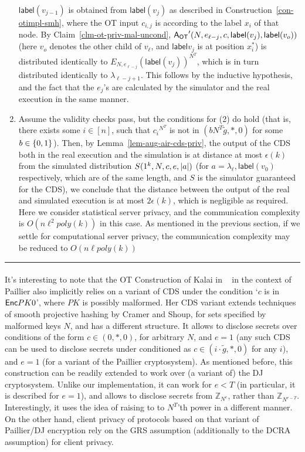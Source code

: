 \documentclass[11pt]{article}
\newenvironment{proof}{\noindent {\bf Proof:} \hspace{.677em}}%
                     {\qed}
\newcommand{\qed}{\hspace*{\fill}\rule{0.6em}{0.6em}}
\newcommand{\eps}{{\epsilon}}
\newcommand{\lab}{{\mathsf{label}}}
\newcommand{\enc}{{\sf Enc}}
\newcommand{\ansot}{{\sf A_{OT}}}
\newcommand{\Z}{\mathbb{Z}}
\newcommand\ot{\mbox{OT}\xspace}
\newcommand{\encr}[2]{E_{#1}(#2)}
\newcommand{\mathify}[1]{\ifmmode{#1}\else\mbox{$#1$}\fi}
\newcommand{\set}[2][]{\mathify{{\left\{#2\right\}}^{#1}}}
\newcommand{\bools}[1][]{\set[#1]{0,1}}
\newcommand{\size}[1]{\mathify{\left| #1 \right|}}
\begin{document}
\begin{proof}
\begin{enumerate}
$\lab(v_{j-1})$ is obtained from $\lab(v_j)$ as described in Construction~\ref{con-otimpl-smh},
where the \ot input $c_{i,j}$ is according to the label $x_i$ of that node.
By Claim~\ref{clm-ot-priv-mal-uncond}, $\ansot'(N,e_{\ell-j},c,\lab(v_j),\lab(v_o))$ (here $v_o$ denotes
the other child of $v_{\ell}$, and $\lab{v_j}$ is at position $x^*_i$) is distributed identically
to $\encr{N,e_{\ell-j}}{\lab(v_j)}^{N^T}$, which is in turn distributed identically to
$\lambda_{\ell-j+1}$.
This follows by the inductive hypothesis, and the fact that the $e_j$'s are calculated by the simulator and the real execution in the same manner.
\item Assume the validity checks pass, but the conditions for (2) do hold (that is, there exists some $i\in[n]$, such that ${c_i}^{N^T}$ is not in $(bN^T\tilde{g},*,0)$ for some $b\in\bools$). Then, by Lemma~\ref{lem-aug-air-cds-priv}, the output of the CDS both in the real execution and the simulation is at distance at most $\eps(k)$ from the simulated distribution
$S(1^k,N,c,e,\size{a})$ (for $a=\lambda_\ell,\lab(v_0)$ respectively, which are of the same length, and $S$ is the simulator guaranteed for the CDS), we conclude that the distance between the output of the real and simulated execution is at most $2\eps(k)$, which is negligible as required. Here we consider statistical server privacy, and the communication complexity
is $O(n\ell^2poly(k))$ in this case. As mentioned in the previous section, if we settle for computational server privacy, the communication complexity may be reduced to $O(n\ell poly(k))$
\end{enumerate}
\end{proof}

\paragraph{} It's interesting to note that the \ot Construction of Kalai in ~\cite{T05} in the context
of Paillier also implicitly relies on a variant of CDS under the condition `$c$ is in $\enc{PK}{0}$',
where $PK$ is possibly malformed.
Her CDS variant extends techniques of smooth projective hashing by Cramer and Shoup,
for sets specified by malformed keys $N$, and has a different structure.
It allows to disclose secrets over conditions of the form $c\in(0,*,0)$, for arbitrary $N$, and $e=1$
(any such CDS can be used to disclose secrets under conditioned as $c\in(i\cdot \tilde{g},*,0)$ for any $i$),
and $e=1$ (for a variant of the Paillier cryptosystem). As mentioned before, this construction can be
readily extended to work over (a variant of) the DJ cryptosystem. Unlike our implementation, it can work
for $e<T$ (in particular, it is described for $e=1$), and allows to disclose secrets from $\Z_{N^e}$,
rather than $\Z_{N^{e-T}}$. Interestingly, it uses the idea of raising to to $N^T$'th power in a different manner. On the other hand, client privacy of protocols based on that variant of Paillier/DJ encryption
rely on the GRS assumption (additionally to the DCRA assumption) for client privacy.
\end{document}
